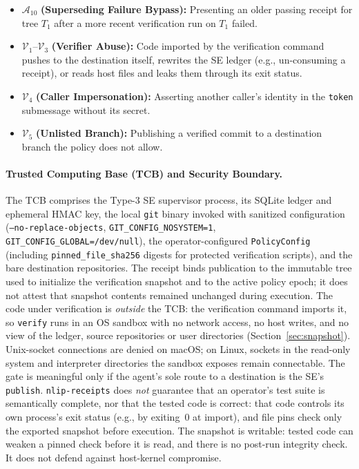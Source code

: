 \documentclass[sigconf,nonacm]{acmart}
\begin{document}
\begin{itemize}
  \item $\mathcal{A}_{10}$ \textbf{(Superseding Failure Bypass):} Presenting an older passing receipt for tree $T_1$ after a more recent verification run on $T_1$ failed.
  \item $\mathcal{V}_1$--$\mathcal{V}_3$ \textbf{(Verifier Abuse):} Code imported by the verification command pushes to the destination itself, rewrites the SE ledger (e.g., un-consuming a receipt), or reads host files and leaks them through its exit status.
  \item $\mathcal{V}_4$ \textbf{(Caller Impersonation):} Asserting another caller's identity in the \texttt{token} submessage without its secret.
  \item $\mathcal{V}_5$ \textbf{(Unlisted Branch):} Publishing a verified commit to a destination branch the policy does not allow.
\end{itemize}

\paragraph{Trusted Computing Base (TCB) and Security Boundary.}
The TCB comprises the Type-3 SE supervisor process, its SQLite ledger and ephemeral HMAC key, the local \texttt{git} binary invoked with sanitized configuration (\texttt{--no-replace-objects}, \texttt{GIT\_CONFIG\_NOSYSTEM=1}, \texttt{GIT\_CONFIG\_GLOBAL=/dev/null}), the operator-configured \texttt{PolicyConfig} (including \texttt{pinned\_file\_sha256} digests for protected verification scripts), and the bare destination repositories. The receipt binds publication to the immutable tree used to initialize the verification snapshot and to the active policy epoch; it does not attest that snapshot contents remained unchanged during execution. The code under verification is \emph{outside} the TCB: the verification command imports it, so \texttt{verify} runs in an OS sandbox with no network access, no host writes, and no view of the ledger, source repositories or user directories (Section~\ref{sec:snapshot}). Unix-socket connections are denied on macOS; on Linux, sockets in the read-only system and interpreter directories the sandbox exposes remain connectable. The gate is meaningful only if the agent's sole route to a destination is the SE's \texttt{publish}. \texttt{nlip-receipts} does \emph{not} guarantee that an operator's test suite is semantically complete, nor that the tested code is correct: that code controls its own process's exit status (e.g., by exiting~0 at import), and file pins check only the exported snapshot before execution. The snapshot is writable: tested code can weaken a pinned check before it is read, and there is no post-run integrity check. It does not defend against host-kernel compromise.
\end{document}
